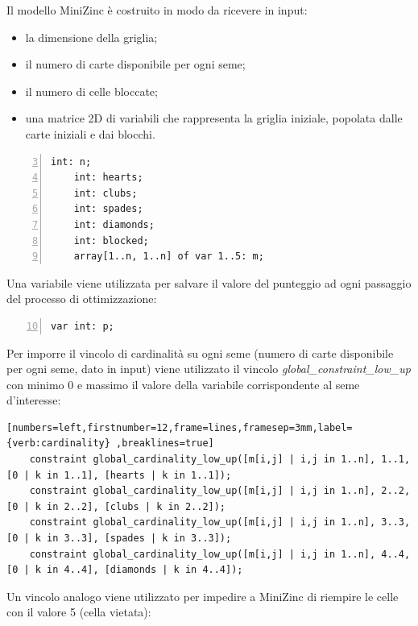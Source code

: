 \documentclass[12pt]{article}
\begin{document}
    Il modello MiniZinc è costruito in modo da ricevere in input:

    \begin{itemize}
        \item la dimensione della griglia;
        \item il numero di carte disponibile per ogni seme;
        \item il numero di celle bloccate;
        \item una matrice 2D di variabili che rappresenta la griglia iniziale, popolata dalle carte iniziali e dai blocchi.
    \end{itemize}

    \begin{Verbatim}[numbers=left,firstnumber=3,frame=lines,framesep=3mm,label={verb:input}]
    int: n;
    int: hearts;
    int: clubs;
    int: spades;
    int: diamonds;
    int: blocked;
    array[1..n, 1..n] of var 1..5: m;
    \end{Verbatim}

    Una variabile viene utilizzata per salvare il valore del punteggio ad ogni passaggio del processo di ottimizzazione:

    \begin{Verbatim}[numbers=left,firstnumber=10,frame=lines,framesep=3mm,label={verb:score}]
    var int: p;
    \end{Verbatim}

    Per imporre il vincolo di cardinalità su ogni seme (numero di carte disponibile per ogni seme, dato in input) viene utilizzato il vincolo \textit{global\_constraint\_low\_up} con minimo 0 e massimo il valore della variabile corrispondente al seme d'interesse:

    \begin{Verbatim}[numbers=left,firstnumber=12,frame=lines,framesep=3mm,label={verb:cardinality} ,breaklines=true]
    constraint global_cardinality_low_up([m[i,j] | i,j in 1..n], 1..1, [0 | k in 1..1], [hearts | k in 1..1]);
    constraint global_cardinality_low_up([m[i,j] | i,j in 1..n], 2..2, [0 | k in 2..2], [clubs | k in 2..2]);
    constraint global_cardinality_low_up([m[i,j] | i,j in 1..n], 3..3, [0 | k in 3..3], [spades | k in 3..3]);
    constraint global_cardinality_low_up([m[i,j] | i,j in 1..n], 4..4, [0 | k in 4..4], [diamonds | k in 4..4]);
    \end{Verbatim}

    Un vincolo analogo viene utilizzato per impedire a MiniZinc di riempire le celle con il valore 5 (cella vietata):
\end{document}
